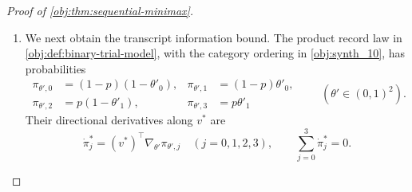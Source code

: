 \documentclass[11pt]{article}
\begin{document}
\begin{proof}[Proof of \cref{obj:thm:sequential-minimax}]
\begin{enumerate}
For sufficiently large \(n\), define the prior-averaged information envelope
\[
\mathcal J_{n,R}
=
\int_{-R}^{R}
\overline w_R(a)G(\vartheta_n(a),t^*)\,da.
\]
The feasible weight set is compact: its row-normalization equations and nonnegative coordinates imply
\[
0\le\alpha_S\le1
\quad(S\in\mathcal S,\ \alpha\in\mathcal A_\varepsilon).
\]
Moreover, for interior \(\theta'\),
\[
1\le h_S(\theta')\le e^\varepsilon.
\]
Consequently, \(F_{\theta'}(\alpha,t^*)\) is jointly continuous in \((\theta',\alpha)\). Compactness gives continuity of its maximum, with
\[
|G(\theta',t^*)-G(\theta_0,t^*)|
\le
\max_{\alpha\in\mathcal A_\varepsilon}
|F_{\theta'}(\alpha,t^*)-F_{\theta_0}(\alpha,t^*)|.
\]
It follows that
\[
\sup_{|a|\le R}
|G(\vartheta_n(a),t^*)-J_0|
\longrightarrow0,
\qquad
\mathcal J_{n,R}\longrightarrow J_0.
\]
Equivalently, one may integrate the pointwise convergence using the eventual dominating function
\[
\bigl|\overline w_R(a)G(\vartheta_n(a),t^*)\bigr|
\le (|J_0|+1)\overline w_R(a).
\]

\item
We next obtain the transcript information bound. The product record law in \cref{obj:def:binary-trial-model}, with the category ordering in \cref{obj:synth_10}, has probabilities
\[
\begin{aligned}
\pi_{\theta',0}&=(1-p)(1-\theta'_0),&
\pi_{\theta',1}&=(1-p)\theta'_0,\\
\pi_{\theta',2}&=p(1-\theta'_1),&
\pi_{\theta',3}&=p\theta'_1
\end{aligned}
\qquad(\theta'\in(0,1)^2).
\]
Their directional derivatives along \(v^*\) are
\[
\dot\pi_j^*=(v^*)^\top\nabla_{\theta'}\pi_{\theta',j}
\quad(j=0,1,2,3),
\qquad
\sum_{j=0}^3\dot\pi_j^*=0.
\]


\end{enumerate}
\end{proof}
\end{document}
